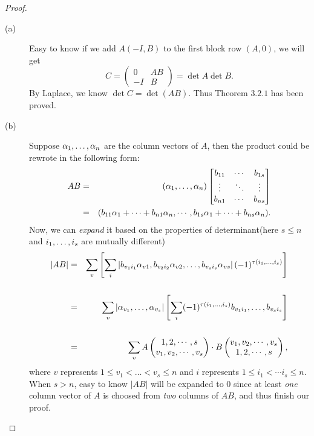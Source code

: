 \begin{proof}
	\begin{description}
	\item[(a)] Easy to know if we add $A(-I,B)$ to the first block row $(A,0)$, we will get
	\[C=\begin{pmatrix}0&AB\\-I&B\end{pmatrix}=\det A \det B.\]
	By Laplace, we know $\det C=\det (AB)$. Thus Theorem $3.2.1$ has been proved.
	\item[(b)] Suppose $\alpha_1,\ldots,\alpha_n$ are the column vectors of $A$, then the product could be rewrote in the following form:
	\begin{eqnarray*}
		AB &=& (\alpha_1,\ldots,\alpha_n)\begin{bmatrix} b_{11}&\cdots&b_{1s}\\ \vdots&\ddots&\vdots\\ b_{n 1}&\cdots&b_{ns} \end{bmatrix}\\
		&=&(b_{11}\alpha_1+\cdots+b_{n1}\alpha_n,\cdots,b_{1s}\alpha_1+\cdots+b_{ns}\alpha_n).
	\end{eqnarray*} 
	Now, we can \emph{expand} it based on the properties of determinant(here $s\leq n$ and $i_1,\ldots,i_s$ are mutually different)
	\begin{eqnarray*}
		|AB| &=& \sum_{v}
		\left[
			\sum_{i}
			\left|
				b_{v_1i_1}\alpha_{v1},b_{v_2i_2}\alpha_{v2},\ldots,b_{v_si_s}\alpha_{vs}
			\right|
			(-1)^{\tau(\seq{i}{1}{s})}
		\right]\\
		&&\vspace{20pt}\\
		&=& \sum_{v} |\alpha_{v_1},\ldots,\alpha_{v_s}|
		\left[
			\sum_{i}
			(-1)^{\tau(\seq{i}{1}{s})}
			b_{v_1i_1},\ldots,b_{v_si_s}
		\right]\\
		&&\vspace{20pt}\\
		&=& \sum_{v}
			A
			\begin{pmatrix}
				1,2,\cdots,s\\
				v_1,v_2,\cdots,v_s
			\end{pmatrix}
			\cdot B
			\begin{pmatrix}
				v_1,v_2,\cdots,v_s\\
				1,2,\cdots,s
			\end{pmatrix},
	\end{eqnarray*}
	where $v$ represents $1\leq v_1<\dots<v_s\leq n$ and $i$ represents $1\leq i_1<\cdots i_s\leq n$. When $s>n$, easy to know $|AB|$ will be expanded to $0$ since at least \emph{one} column vector of $A$ is choosed from \emph{two} columns of $AB$, and thus finish our proof.
	\end{description}
\end{proof}

